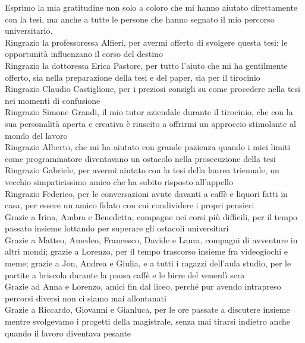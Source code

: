 
\begin{acknowledgements}      
Esprimo la mia gratitudine non solo a coloro che mi hanno aiutato direttamente con la tesi, ma anche a tutte le persone che hanno segnato il mio percorso universitario.\\
Ringrazio la professoressa Alfieri, per avermi offerto di svolgere questa tesi: le opportunità influenzano il corso del destino\\
Ringrazio la dottoressa Erica Pastore, per tutto l'aiuto che mi ha gentilmente offerto, sia nella preparazione della tesi e del paper, sia per il tirocinio\\
Ringrazio Claudio Castiglione, per i preziosi consigli su come procedere nella tesi nei momenti di confusione\\
Ringrazio Simone Grandi, il mio tutor aziendale durante il tirocinio, che con la sua personalità aperta e creativa è riuscito a offrirmi un approccio stimolante al mondo del lavoro\\
Ringrazio Alberto, che mi ha aiutato con grande pazienza quando i miei limiti come programmatore diventavano un ostacolo nella prosecuzione della tesi\\
Ringrazio Gabriele, per avermi aiutato con la tesi della laurea triennale, un vecchio simpaticissimo amico che ha subito risposto all’appello\\
Ringrazio Federico, per le conversazioni avute davanti a caffè e liquori fatti in casa, per essere un amico fidato con cui condividere i propri pensieri\\
Grazie a Irina, Ambra e Benedetta, compagne nei corsi più difficili, per il tempo passato insieme lottando per superare gli ostacoli universitari\\
Grazie a Matteo, Amedeo, Francesco, Davide e Laura, compagni di avventure in altri mondi; grazie a Lorenzo, per il tempo trascorso insieme fra videogiochi e meme; grazie a Jon, Andrea e Giulia, e a tutti i ragazzi dell’aula studio, per le partite a briscola durante la pausa caffè e le birre del venerdì sera\\
Grazie ad Anna e Lorenzo, amici fin dal liceo, perché pur avendo intrapreso percorsi diversi non ci siamo mai allontanati\\
Grazie a Riccardo, Giovanni e Gianluca, per le ore passate a discutere insieme mentre svolgevamo i progetti della magistrale, senza mai tirarsi indietro anche quando il lavoro diventava pesante\\

\end{acknowledgements}
